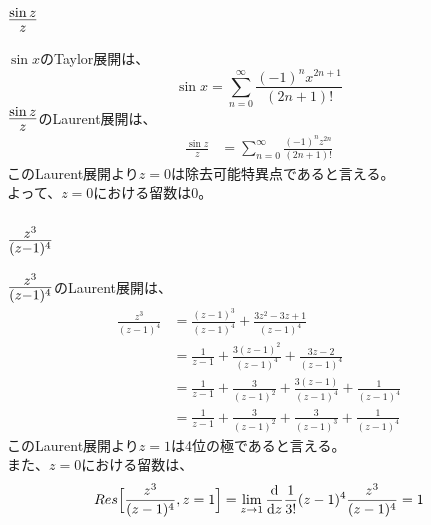 \documentclass[dvipdfmx,a4paper]{jsarticle}
\begin{document}
\subsubsection{$\mbox{\Large$\frac{\sin{z}}{z}$}$}
$\sin{x}$のTaylor展開は、
$$
\sin{x} = \sum^{\infty}_{n = 0}\frac{(-1)^n x^{2n+1}}{(2n + 1)!}
$$
$\mbox{\Large$\frac{\sin{z}}{z}$}$のLaurent展開は、
\begin{align*}
\frac{\sin{z}}{z} &= \sum^{\infty}_{n = 0}\frac{(-1)^n z^{2n}}{(2n + 1)!}
\end{align*}
このLaurent展開より$z=0$は除去可能特異点であると言える。\\
よって、$z =0$における留数は0。\\

\subsubsection{$\mbox{\Large$\frac{z^3}{(z-1)^4}$}$}
$\mbox{\Large$\frac{z^3}{(z-1)^4}$}$のLaurent展開は、
\begin{align*}
\frac{z^3}{(z-1)^4} &= \frac{(z-1)^3}{(z-1)^4} + \frac{3z^2 - 3z +1}{(z-1)^4}\\
&= \frac{1}{z-1} + \frac{3(z-1)^2}{(z-1)^4} + \frac{3z -2}{(z-1)^4}\\
&= \frac{1}{z-1} + \frac{3}{(z-1)^2} + \frac{3(z-1)}{(z-1)^4} + \frac{1}{(z-1)^4}\\
&= \frac{1}{z-1} + \frac{3}{(z-1)^2} + \frac{3}{(z-1)^3} + \frac{1}{(z-1)^4}
\end{align*}
このLaurent展開より$z=1$は4位の極であると言える。\\
また、$z =0$における留数は、
$$
Res\Bigl[\frac{z^3}{(z-1)^4}, z = 1\Bigr] = \lim_{z \to 1}\frac{\mathrm{d}}{\mathrm{d}z}\frac{1}{3!}(z-1)^4\frac{z^3}{(z-1)^4} = 1
$$\\
\end{document}
